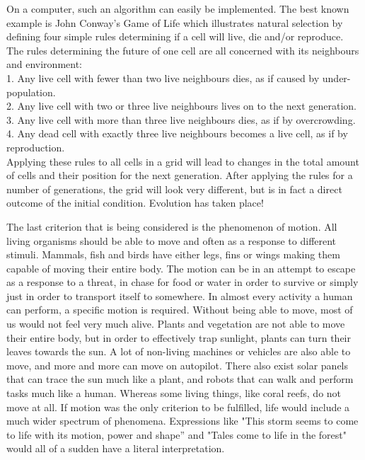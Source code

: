 On a computer, such an algorithm can easily be implemented. The best known example is John Conway's Game of Life \cite{Conway} which illustrates natural selection by defining four simple rules determining if a cell will live, die and/or reproduce. The rules determining the future of one cell are all concerned with its neighbours and environment: \\
1. Any live cell with fewer than two live neighbours dies, as if caused by under-population. \\
2. Any live cell with two or three live neighbours lives on to the next generation. \\
3. Any live cell with more than three live neighbours dies, as if by overcrowding. \\
4. Any dead cell with exactly three live neighbours becomes a live cell, as if by reproduction. \\
Applying these rules to all cells in a grid will lead to changes in the total amount of cells and their position for the next generation. After applying the rules for a number of generations, the grid will look very different, but is in fact a direct outcome of the initial condition. Evolution has taken place!

The last criterion that is being considered is the phenomenon of motion. All living organisms should be able to move and often as a response to different stimuli. Mammals, fish and birds have either legs, fins or wings making them capable of moving their entire body. The motion can be in an attempt to escape as a response to a threat, in chase for food or water in order to survive or simply just in order to transport itself to somewhere. In almost every activity a human can perform, a specific motion is required. Without being able to move, most of us would not feel very much alive. Plants and vegetation are not able to move their entire body, but in order to effectively trap sunlight, plants can turn their leaves towards the sun. A lot of non-living machines or vehicles are also able to move, and more and more can move on autopilot. There also exist solar panels that can trace the sun much like a plant, and robots that can walk and perform tasks much like a human. Whereas some living things, like coral reefs, do not move at all. If motion was the only criterion to be fulfilled, life would include a much wider spectrum of phenomena. Expressions like "This storm seems to come to life with its motion, power and shape'' and "Tales come to life in the forest" would all of a sudden have a literal interpretation. 

